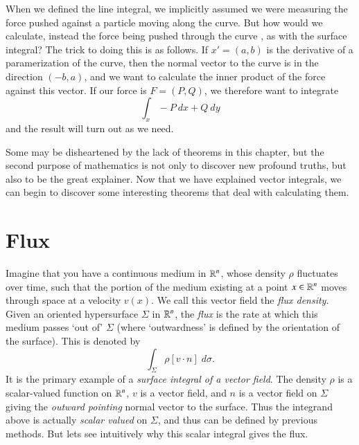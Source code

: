 When we defined the line integral, we implicitly assumed we were measuring the force pushed against a particle moving along the curve. But how would we calculate, instead the force being pushed through the curve , as with the surface integral? The trick to doing this is as follows. If $x' = (a,b)$ is the derivative of a paramerization of the curve, then the normal vector to the curve is in the direction $(-b,a)$, and we want to calculate the inner product of the force against this vector. If our force is $F = (P,Q)$, we therefore want to integrate
%
\[ \int_x -P\ dx + Q\ dy \]
%
and the result will turn out as we need.

Some may be disheartened by the lack of theorems in this chapter, but the second purpose of mathematics is not only to discover new profound truths, but also to be the great explainer. Now that we have explained vector integrals, we can begin to discover some interesting theorems that deal with calculating them.





\section{Flux}

Imagine that you have a continuous medium in $\operatorname{\mathbb{R}}^n$, whose density $\rho$ fluctuates over time, such that the portion of the medium existing at a point $x \in \operatorname{\mathbb{R}}^n$ moves through space at a velocity $v(x)$. We call this vector field the \emph{flux density}. Given an oriented hypersurface $\Sigma$ in $\operatorname{\mathbb{R}}^n$, the \emph{flux} is the rate at which this medium passes `out of' $\Sigma$ (where `outwardness' is defined by the orientation of the surface). This is denoted by
%
\[ \int_\Sigma \rho [v \cdot n]\; d\sigma. \]
%
It is the primary example of a \emph{surface integral of a vector field}. The density $\rho$ is a scalar-valued function on $\operatorname{\mathbb{R}}^n$, $v$ is a vector field, and $n$ is a vector field on $\Sigma$ giving the \emph{outward pointing} normal vector to the surface. Thus the integrand above is actually \emph{scalar valued} on $\Sigma$, and thus can be defined by previous methods. But lets see intuitively why this scalar integral gives the flux.

